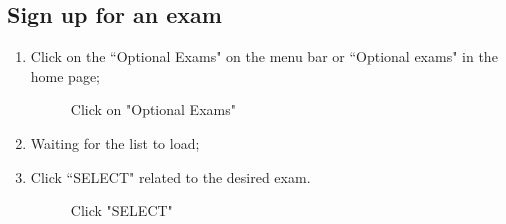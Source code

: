 \documentclass[ManualeUtente]{subfiles}
\begin{document}
\subsection{Sign up for an exam}
\begin{enumerate}
	\item Click on the \textquotedblleft Optional Exams" on the menu bar or \textquotedblleft Optional exams" in the home page;
	\begin{figure}[H]
		\centering
		\caption{Click on "Optional Exams"}
		\label{fig:Click on "Optional Exams"}
	\end{figure}
	\item Waiting for the list to load;
	\item Click \textquotedblleft SELECT" related to the desired exam.
	\begin{figure}[H]
	\centering
	\caption{Click "SELECT"}
	\label{fig:Click "SELECT"}
	\end{figure}
\end{enumerate}
\end{document}
